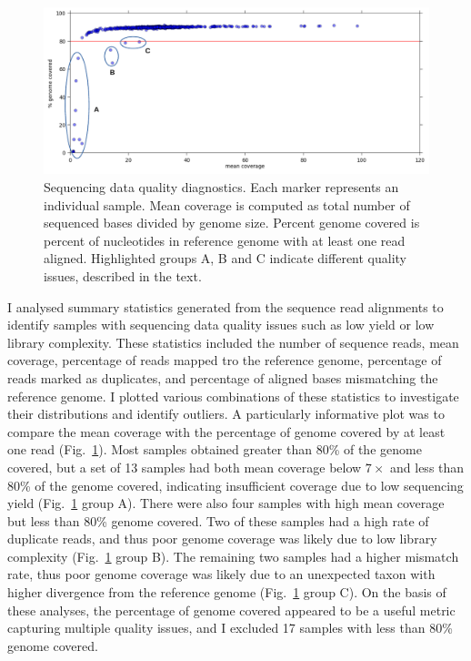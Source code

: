 \documentclass[a4paper,11pt,abstracton,hidelinks]{scrartcl}
\begin{document}
\begin{figure}[t!]
\centering
\includegraphics[width=\textwidth]{artwork/chapter3/coverage.pdf}
\caption{Sequencing data quality diagnostics.
%
Each marker represents an individual sample.
%
Mean coverage is computed as total number of sequenced bases divided by genome size.
%
Percent genome covered is percent of nucleotides in reference genome with at least one read aligned.
%
Highlighted groups A, B and C indicate different quality issues, described in the text.
}
%
\label{fig:coverage}
\end{figure}


I analysed summary statistics generated from the sequence read alignments to identify samples with sequencing data quality issues such as low yield or low library complexity.
%
These statistics included the number of sequence reads, mean coverage, percentage of reads mapped tro the reference genome, percentage of reads marked as duplicates, and percentage of aligned bases mismatching the reference genome.
%
I plotted various combinations of these statistics to investigate their distributions and identify outliers.
%
A particularly informative plot was to compare the mean coverage with the percentage of genome covered by at least one read (Fig.~\ref{fig:coverage}).
%
Most samples obtained greater than 80\% of the genome covered, but a set of 13 samples had both mean coverage below $7\times$ and less than 80\% of the genome covered, indicating insufficient coverage due to low sequencing yield (Fig.~\ref{fig:coverage} group A).
%
There were also four samples with high mean coverage but less than 80\% genome covered.
%
Two of these samples had a high rate of duplicate reads, and thus poor genome coverage was likely due to low library complexity (Fig.~\ref{fig:coverage} group B).
%
The remaining two samples had a higher mismatch rate, thus poor genome coverage was likely due to an unexpected taxon with higher divergence from the reference genome (Fig.~\ref{fig:coverage} group C).
%
On the basis of these analyses, the percentage of genome covered appeared to be a useful metric capturing multiple quality issues, and I excluded 17 samples with less than 80\% genome covered.
%
\end{document}
